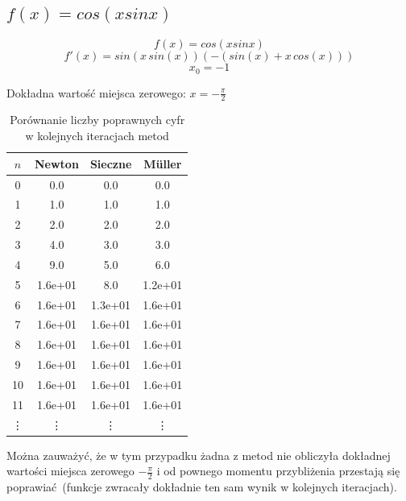 \documentclass[12pt]{article}
\begin{document}
\subsection{$f(x) = cos(xsinx)$}

\[f(x) = cos(xsinx)\]
\[f'(x) = sin(x\,sin(x))(-(sin(x)+x\,cos(x)))\]
\[x_0 = -1\]
\begin{center}
    Dokładna wartość miejsca zerowego: $x = -\frac{\pi}{2}$
\end{center}

\begin{table}[H]
\centering
\begin{tabular}{|c|c|c|c|}
    \hline
    $n$ & Newton & Sieczne & Müller  \\ \hline\hline
    0  & 0.0     & 0.0     & 0.0     \\ \hline
    1  & 1.0     & 1.0     & 1.0     \\ \hline
    2  & 2.0     & 2.0     & 2.0     \\ \hline
    3  & 4.0     & 3.0     & 3.0     \\ \hline
    4  & 9.0     & 5.0     & 6.0     \\ \hline
    5  & 1.6e+01 & 8.0     & 1.2e+01 \\ \hline
    6  & 1.6e+01 & 1.3e+01 & 1.6e+01 \\ \hline
    7  & 1.6e+01 & 1.6e+01 & 1.6e+01 \\ \hline
    8  & 1.6e+01 & 1.6e+01 & 1.6e+01 \\ \hline
    9  & 1.6e+01 & 1.6e+01 & 1.6e+01 \\ \hline
    10 & 1.6e+01 & 1.6e+01 & 1.6e+01 \\ \hline
    11 & 1.6e+01 & 1.6e+01 & 1.6e+01 \\ \hline
    \vdots & \vdots & \vdots & \vdots \\ \hline
\end{tabular}
\caption{Porównanie liczby poprawnych cyfr w kolejnych iteracjach metod}
\label{table:table6}
\end{table}

Można zauważyć, że w tym przypadku żadna z metod nie obliczyła dokładnej
wartości miejsca zerowego $-\frac{\pi}{2}$ i od pownego momentu przybliżenia
przestają się poprawiać (funkcje zwracały dokładnie ten sam wynik w kolejnych
iteracjach).
\end{document}
